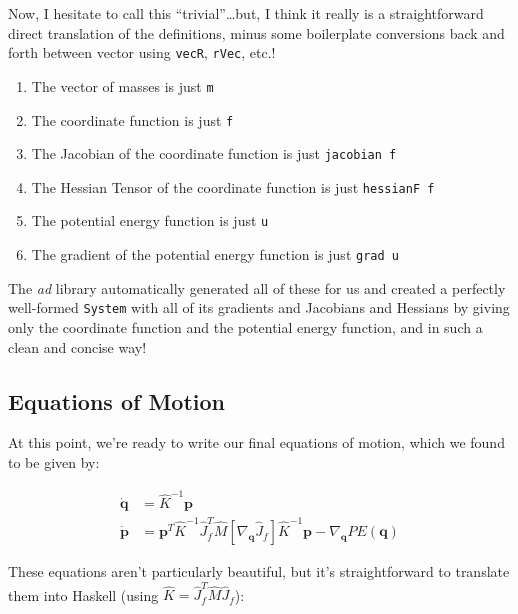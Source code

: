 \documentclass[]{article}
\begin{document}
Now, I hesitate to call this ``trivial''\ldots but, I think it really is a
straightforward direct translation of the definitions, minus some boilerplate
conversions back and forth between vector using \texttt{vecR}, \texttt{rVec},
etc.!

\begin{enumerate}
\def\labelenumi{\arabic{enumi}.}
\tightlist
\item
  The vector of masses is just \texttt{m}
\item
  The coordinate function is just \texttt{f}
\item
  The Jacobian of the coordinate function is just \texttt{jacobian\ f}
\item
  The Hessian Tensor of the coordinate function is just \texttt{hessianF\ f}
\item
  The potential energy function is just \texttt{u}
\item
  The gradient of the potential energy function is just \texttt{grad\ u}
\end{enumerate}

The \emph{ad} library automatically generated all of these for us and created a
perfectly well-formed \texttt{System} with all of its gradients and Jacobians
and Hessians by giving only the coordinate function and the potential energy
function, and in such a clean and concise way!

\subsection{Equations of Motion}\label{equations-of-motion}

At this point, we're ready to write our final equations of motion, which we
found to be given by:

\[
\begin{aligned}
\dot{\mathbf{q}} & = \hat{K}^{-1} \mathbf{p} \\
\dot{\mathbf{p}} & = \mathbf{p}^T \hat{K}^{-1} \hat{J}_f^T \hat{M}
        \left[ \nabla_{\mathbf{q}} \hat{J}_f \right] \hat{K}^{-1} \mathbf{p}
    - \nabla_{\mathbf{q}} PE(\mathbf{q})
\end{aligned}
\]

These equations aren't particularly beautiful, but it's straightforward to
translate them into Haskell (using \(\hat{K} = \hat{J}_f^T \hat{M} \hat{J}_f\)):
\end{document}
